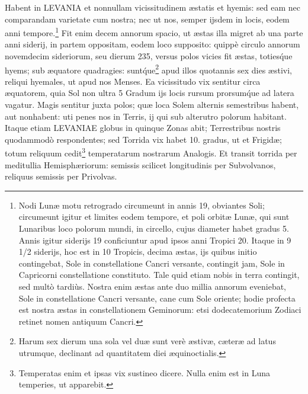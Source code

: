 \documentclass[a4paper, 11pt, oneside, polutonikogreek, german]{article}
\begin{document}
Habent in LEVANIA et nonnullam vicissitudinem æstatis et hyemis: sed eam nec comparandam varietate cum nostra; nec ut nos, semper ijsdem in locis, eodem anni tempore.\footnote{Nodi Lunæ motu retrogrado circumeunt in annis 19, obviantes Soli; circumeunt igitur et limites eodem tempore, et poli orbitæ Lunæ, qui sunt Lunaribus loco polorum mundi, in circello, cujus diameter habet gradus 5. Annis igitur siderijs 19 conficiuntur apud ipsos anni Tropici 20. Itaque in 9 1/2 siderijs, hoc est in 10 Tropicis, decima æstas, ijs quibus initio contingebat, Sole in constellatione Cancri versante, contingit jam, Sole in Capricorni constellatione constituto. Tale quid etiam nobis in terra contingit, sed multò tardiùs. Nostra enim æstas ante duo millia annorum eveniebat, Sole in constellatione Cancri versante, cane cum Sole oriente; hodie profecta est nostra æstas in constellationem Geminorum: etsi dodecatemorium Zodiaci retinet nomen antiquum Cancri.} Fit enim decem annorum spacio, ut æstas illa migret ab una parte anni siderij, in partem oppositam, eodem loco supposito: quippè circulo annorum novemdecim sideriorum, seu dierum 235, versus polos vicies fit æstas, toties\'que hyems; sub æquatore quadragies: sunt\'que\footnote{Harum sex dierum una sola vel duæ sunt verè æstivæ, cæteræ ad latus utrumque, declinant ad quantitatem diei æquinoctialis.} apud illos quotannis sex dies æstivi, reliqui hyemales, ut apud nos Menses. Ea vicissitudo vix sentitur circa æquatorem, quia Sol non ultra 5 Gradum ijs locis rursum prorsum\'que ad latera vagatur. Magis sentitur juxta polos; quæ loca Solem alternis semestribus habent, aut nonhabent: uti penes nos in Terris, ij qui sub alterutro polorum habitant. Itaque etiam LEVANIAE globus in quinque Zonas abit; Terrestribus nostris quodammodò respondentes; sed Torrida vix habet 10. gradus, ut et Frigidæ; totum reliquum cedit\footnote{Temperatas enim et ipsas vix sustineo dicere. Nulla enim est in Luna temperies, ut apparebit.} temperatarum nostrarum Analogis. Et transit torrida per meditullia Hemisphæriorum: semissis scilicet longitudinis per Subvolvanos, reliquus semissis per Privolvas.
\end{document}
